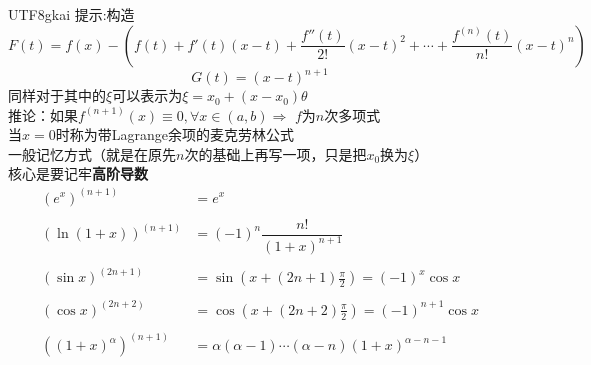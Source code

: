 \documentclass{article}
\newcommand{\parameter}[1]{\left(#1\right)}
\begin{document}
\begin{CJK}{UTF8}{gkai}
提示:构造\[F(t) = f(x) - (f(t) + f'(t) (x-t) + \dfrac{f''(t)}{2 !} (x-t)^2 + \cdots + \dfrac{f^{(n)}(t)}{n !} (x-t)^n )\]\[G(t) = (x-t) ^ {n+1}\]
同样对于其中的$\xi$可以表示为$\xi = x_0 + (x- x_0) \theta$\\

推论：如果$f^{(n+1)}(x)\equiv 0,\forall x\in (a,b)\Rightarrow$ $f$为$n$次多项式\\


当$x=0$时称为带Lagrange余项的麦克劳林公式\\

一般记忆方式（就是在原先$n$次的基础上再写一项，只是把$x_0$换为$\xi$）\\
核心是要记牢\textbf{高阶导数}
\[
\begin{aligned}
    (e^x)^{(n + 1)} &= e^x\\
    &\\
    (\ln(1 + x))^{(n + 1)} &= (-1)^n \dfrac{n !}{(1 + x)^{n + 1}} \\
    &\\
    (\sin x)^{(2n + 1)} &= \sin \parameter{x + (2n + 1) \frac{\pi}{2}} = (-1)^{x} \cos x\\
    &\\
    (\cos x)^{(2n + 2)} &= \cos \parameter{x + (2n + 2) \frac{\pi}{2}} = (-1)^{n + 1} \cos x\\   
    &\\
    ((1 + x)^\alpha)^{(n + 1)} &= \alpha(\alpha - 1)\cdots (\alpha - n)(1 + x)^{\alpha - n - 1}\\
\end{aligned}   
\]


\end{CJK}
\end{document}
